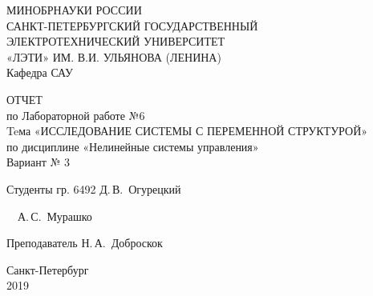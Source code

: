 \thispagestyle{empty}
\begin{titlepage}
  \begin{center}

 	\bfseries{
	МИНОБРНАУКИ РОССИИ \\[8bp]
	САНКТ-ПЕТЕРБУРГСКИЙ ГОСУДАРСТВЕННЫЙ \\[8bp]
	ЭЛЕКТРОТЕХНИЧЕСКИЙ УНИВЕРСИТЕТ \\[8bp]
	«ЛЭТИ» ИМ. В.И. УЛЬЯНОВА (ЛЕНИНА) \\[8bp]
	Кафедра САУ
	\vspace{5cm}
	    
	 
	ОТЧЕТ\\[8bp] 
	по Лабораторной работе №6\\[8bp]
	Teма «ИССЛЕДОВАНИЕ СИСТЕМЫ С ПЕРЕМЕННОЙ СТРУКТУРОЙ» \\[8bp]
	по дисциплине «Нелинейные системы управления»\\[8bp]
	Вариант № 3
}

\end{center}


\newlength{\ML}
\vfill 
  Студенты гр. 6492 \hfill
  \underline{\hspace{\ML}} Д.\,В.~Огурецкий 
  
  \hfill 
   \underline{\hspace{\ML}} ~~А.\,С.~Мурашко 
   
  Преподаватель\hfill
  \underline{\hspace{\ML}} Н.\,А.~Доброскок


 
\begin{center}
  Санкт-Петербург\\[8bp]
  2019
  
\end{center}
\end{titlepage}
